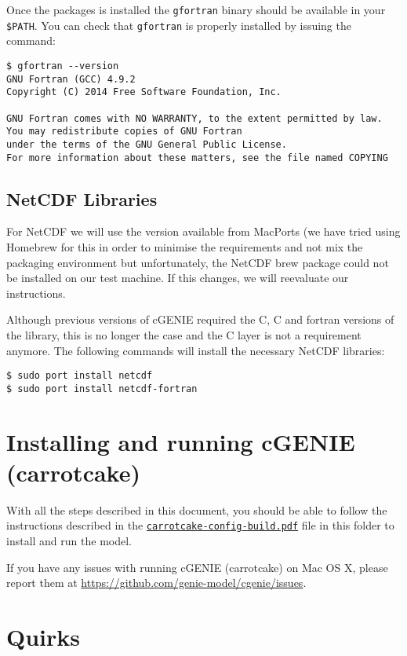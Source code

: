 \documentclass{scrartcl}
\DeclareRobustCommand\Cpp{\hbox{C\hspace{-.05em}\raisebox{.2ex}{\textbf{+\kern-.2ex+}}}}
\begin{document}
Once the packages is installed the \texttt{gfortran} binary should be available
in your \verb|$PATH|. You can check that \texttt{gfortran} is properly
installed by issuing the command:

\begin{verbatim}
$ gfortran --version
GNU Fortran (GCC) 4.9.2
Copyright (C) 2014 Free Software Foundation, Inc.

GNU Fortran comes with NO WARRANTY, to the extent permitted by law.
You may redistribute copies of GNU Fortran
under the terms of the GNU General Public License.
For more information about these matters, see the file named COPYING
\end{verbatim}

\subsection{NetCDF Libraries}

For NetCDF we will use the version available from MacPorts (we have tried using
Homebrew for this in order to minimise the requirements and not mix the
packaging environment but unfortunately, the NetCDF brew package could not be
installed on our test machine. If this changes, we will reevaluate our
instructions.

Although previous versions of cGENIE required the C, \Cpp{} and fortran versions
of the library, this is no longer the case and the \Cpp{} layer is not a
requirement anymore. The following commands  will install the necessary NetCDF
libraries:

\begin{verbatim}
$ sudo port install netcdf
$ sudo port install netcdf-fortran
\end{verbatim}

\section{Installing and running cGENIE (carrotcake)}

With all the steps described in this document, you should be able to follow the
instructions described in the
\href{run:./carrotcake-config-build.pdf}{\texttt{carrotcake-config-build.pdf}} file
in this folder to install and run the model.

If you have any issues with running cGENIE (carrotcake) on Mac OS X, please report
them at \url{https://github.com/genie-model/cgenie/issues}.

\section{Quirks}
\end{document}
